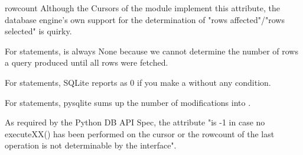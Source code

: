 \begin{memberdesc}{rowcount}
  Although the Cursors of the  module implement this
  attribute, the database engine's own support for the determination of "rows
  affected"/"rows selected" is quirky.

  For  statements,  is always None because we cannot
  determine the number of rows a query produced until all rows were fetched.

  For  statements, SQLite reports  as 0 if you make a
   without any condition.

  For  statements, pysqlite sums up the number of
  modifications into .

  As required by the Python DB API Spec, the  attribute "is -1
  in case no executeXX() has been performed on the cursor or the rowcount
  of the last operation is not determinable by the interface".
\end{memberdesc}

